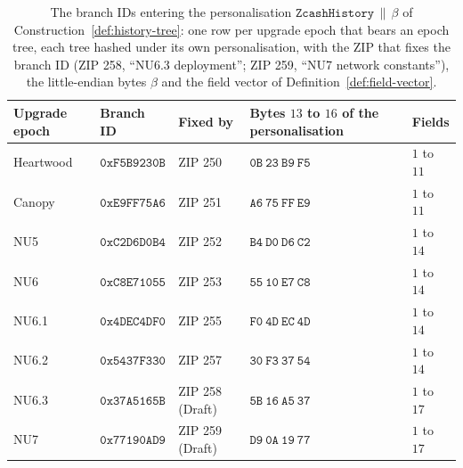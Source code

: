 \documentclass[11pt,a4paper]{article}
\theoremstyle{definition}
\begin{document}
\begin{table}[tbp]
\centering
\small
\begin{tabular}{@{}l l l l l@{}}
\toprule
Upgrade epoch & Branch ID & Fixed by & Bytes $13$ to $16$ of the
  personalisation & Fields \\
\midrule
Heartwood & $\mathtt{0xF5B9230B}$ & ZIP 250 & $\mathtt{0B\ 23\ B9\ F5}$ &
  $1$ to $11$ \\
Canopy & $\mathtt{0xE9FF75A6}$ & ZIP 251 & $\mathtt{A6\ 75\ FF\ E9}$ &
  $1$ to $11$ \\
NU5 & $\mathtt{0xC2D6D0B4}$ & ZIP 252 & $\mathtt{B4\ D0\ D6\ C2}$ &
  $1$ to $14$ \\
NU6 & $\mathtt{0xC8E71055}$ & ZIP 253 & $\mathtt{55\ 10\ E7\ C8}$ &
  $1$ to $14$ \\
NU6.1 & $\mathtt{0x4DEC4DF0}$ & ZIP 255 & $\mathtt{F0\ 4D\ EC\ 4D}$ &
  $1$ to $14$ \\
NU6.2 & $\mathtt{0x5437F330}$ & ZIP 257 & $\mathtt{30\ F3\ 37\ 54}$ &
  $1$ to $14$ \\
NU6.3 & $\mathtt{0x37A5165B}$ & ZIP 258 (Draft) &
  $\mathtt{5B\ 16\ A5\ 37}$ & $1$ to $17$ \\
NU7 & $\mathtt{0x77190AD9}$ & ZIP 259 (Draft) &
  $\mathtt{D9\ 0A\ 19\ 77}$ & $1$ to $17$ \\
\bottomrule
\end{tabular}
\caption{The branch IDs entering the personalisation
$\texttt{ZcashHistory} \,\|\, \beta$ of Construction~\ref{def:history-tree}:
one row per upgrade epoch that bears an epoch tree, each tree hashed under
its own personalisation, with the ZIP that fixes the branch ID (ZIP 258,
``NU6.3 deployment''; ZIP 259, ``NU7 network constants''), the
little-endian bytes $\beta$ and the field vector of
Definition~\ref{def:field-vector}.}
\label{tab:branch-ids}
\end{table}
\end{document}
